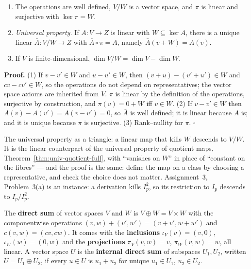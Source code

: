 \documentclass[11pt]{report}
\makeatletter
\newcounter{defcounter}[section]
\newcounter{thmcounter}[section]
\renewenvironment{proof}[1][Proof]{\noindent\textbf{#1.} }{\hfill$\square$\par\vspace{5pt}}
\newcommand{\thmlabel}[1]{\edef\@currentlabel{\arabic{section}.\arabic{thmcounter}}\label{#1}}
\newcommand{\deflabel}[1]{\edef\@currentlabel{\arabic{section}.\arabic{defcounter}}\label{#1}}
\newcommand{\leeref}[1]{\par\smallskip{\raggedleft\footnotesize\textsc{Lee}:\ #1\par}}
\makeatother
\begin{document}
\begin{propbox}\thmlabel{prop:quotient-vs}
\begin{enumerate}
    \item The operations are well defined, $V/W$ is a vector space, and $\pi$ is linear and surjective with $\ker \pi = W$.
    \item \emph{Universal property.} If $A : V \to Z$ is linear with $W \subseteq \ker A$, there is a unique linear $\bar A : V/W \to Z$ with $\bar A \circ \pi = A$, namely $\bar A(v + W) = A(v)$.
    \item If $V$ is finite-dimensional, $\dim V/W = \dim V - \dim W$.
\end{enumerate}
\leeref{App.~B, \emph{Vector Spaces}}
\end{propbox}

\begin{proof}
(1) If $v - v' \in W$ and $u - u' \in W$, then $(v + u) - (v' + u') \in W$ and $cv - cv' \in W$, so the operations do not depend on representatives; the vector space axioms are inherited from $V$. $\pi$ is linear by the definition of the operations, surjective by construction, and $\pi(v) = 0 + W$ iff $v \in W$. (2) If $v - v' \in W$ then $A(v) - A(v') = A(v - v') = 0$, so $\bar A$ is well defined; it is linear because $A$ is; and it is unique because $\pi$ is surjective. (3) Rank--nullity for $\pi$.
\end{proof}

\begin{center}
\end{center}

The universal property as a triangle: a linear map that kills $W$ descends to $V/W$. It is the linear counterpart of the universal property of quotient maps, Theorem~\ref{thm:univ-quotient-full}, with ``vanishes on $W$'' in place of ``constant on the fibres'' --- and the proof is the same: define the map on a class by choosing a representative, and check the choice does not matter. Assignment~3, Problem~3(a) is an instance: a derivation kills $I_p^2$, so its restriction to $I_p$ descends to $I_p/I_p^2$.

\begin{defbox}\deflabel{def:direct-sum}
The \textbf{direct sum} of vector spaces $V$ and $W$ is $V \oplus W = V \times W$ with the componentwise operations $(v, w) + (v', w') = (v + v', w + w')$ and $c(v, w) = (cv, cw)$. It comes with the \textbf{inclusions} $\iota_V(v) = (v, 0)$, $\iota_W(w) = (0, w)$ and the \textbf{projections} $\pi_V(v, w) = v$, $\pi_W(v, w) = w$, all linear. A vector space $U$ is the \textbf{internal direct sum} of subspaces $U_1, U_2$, written $U = U_1 \oplus U_2$, if every $u \in U$ is $u_1 + u_2$ for unique $u_1 \in U_1$, $u_2 \in U_2$.
\end{defbox}
\end{document}
